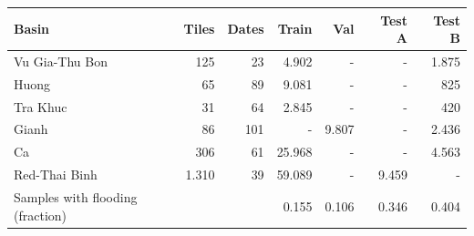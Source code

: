 \begin{tabular}{lrrrrrr}
\toprule
Basin & Tiles & Dates & Train & Val & Test A & Test B \\
\midrule
Vu Gia-Thu Bon
& \num{125}%
& \num{23}%
& \num{4,902}%
& -
& -
& \num{1,875}%
\\
Huong
& \num{65}%
& \num{89}%
& \num{9,081}%
& -
& -
& \num{825}%
\\
Tra Khuc
& \num{31}%
& \num{64}%
& \num{2,845}%
& -
& -
& \num{420}%
\\
Gianh
& \num{86}%
& \num{101}%
& -
& \num{9,807}%
& -
& \num{2,436}%
\\
Ca
& \num{306}%
& \num{61}%
& \num{25,968}%
& -
& -
& \num{4,563}%
\\
Red-Thai Binh
& \num{1,310}%
& \num{39}%
& \num{59,089}%
& -
& \num{9,459}%
& -
\\
\midrule
Samples with flooding (fraction)
& 
& 
& 0.155%
& 0.106%
& 0.346%
& 0.404%
\\
\bottomrule
\end{tabular}
